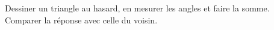 
\begin{exercice}\label{exosmath-0778}

    Dessiner un triangle au hasard, en mesurer les angles et faire la somme. Comparer la réponse avec celle du voisin.

\end{exercice}
